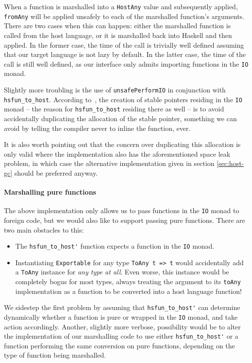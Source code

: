 \documentclass[preprint]{sigplanconf}
\begin{document}
When a function is marshalled into a \lstinline!HostAny! value and subsequently
applied, \lstinline!fromAny! will be applied unsafely to each of the
marshalled function's arguments. There are two cases
when this can happen: either the marshalled function is called from the host
language, or it is marshalled back into Haskell and then applied.
In the former case, the time of the call is trivially well defined assuming
that our target language is not lazy by default.
In the latter case, the time of the call is still well defined, as our
interface only admits importing functions in the \lstinline!IO! monad.

Slightly more troubling is the use of \lstinline!unsafePerformIO! in
conjunction with \lstinline!hsfun_to_host!.
According to\ \cite{stableptr}, the creation of stable pointers residing in
the \lstinline!IO! monad -- the reason for \lstinline!hsfun_to_host! residing
there as well -- is to avoid accidentally duplicating the allocation of the
stable pointer, something we can avoid by telling the compiler never to
inline the function, ever.

It is also worth pointing out that the concern over duplicating this allocation
is only valid where the implementation also has the aforementioned space leak
problem, in which case the alternative implementation given in section
\ref{sec:host-gc} should be preferred anyway.

\paragraph{Marshalling pure functions}
The above implementation only allows us to pass functions in the \lstinline!IO!
monad to foreign code, but we would also like to support passing pure
functions. There are two main obstacles to this:

\begin{itemize}
\item
  The \lstinline!hsfun_to_host'! function expects a function in the
  \lstinline!IO! monad.
\item
  Instantiating \lstinline!Exportable! for any type \lstinline!ToAny t => t!
  would accidentally add a \lstinline!ToAny! instance for
  \emph{any type at all}.
  Even worse, this instance would be completely bogus for most types,
  always treating
  the argument to its \lstinline!toAny! implementation as a function to be
  converted into a host language function!
\end{itemize}

We sidestep the first problem by assuming that \lstinline!hsfun_to_host'!
can determine dynamically whether a function is pure or wrapped in the
\lstinline!IO! monad, and take action accordingly.
Another, slightly more verbose, possibility would be to alter the
implementation of our marshalling code to use either
\lstinline!hsfun_to_host'! or a function performing the same conversion
on pure functions, depending on the type of function being marshalled.
\end{document}
